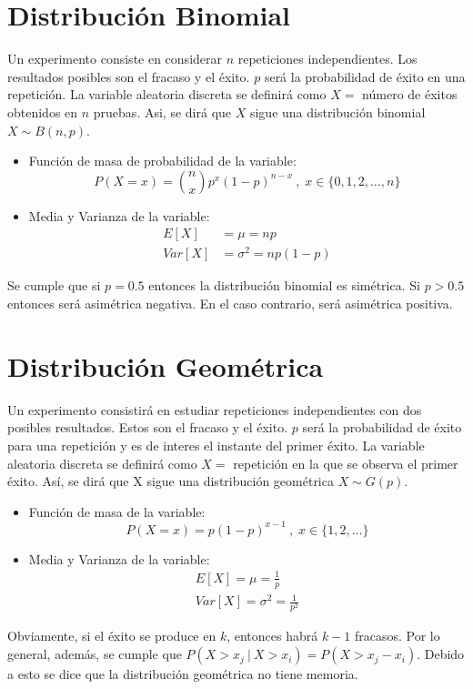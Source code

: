 \documentclass[10pt,a4paper]{book}
\begin{document}
\section{Distribución Binomial}
Un experimento consiste en considerar $n$ repeticiones independientes. Los resultados posibles son el fracaso y el éxito. $p$ será la probabilidad de éxito en una repetición. La variable aleatoria discreta se definirá como $X = $ número de éxitos obtenidos en $n$ pruebas. Asi, se dirá que $X$ sigue una distribución binomial $X\sim B(n,p)$.
\begin{itemize}
	\item Función de masa de probabilidad de la variable:
		\[P(X= x) = \binom{n}{x}p^x(1-p)^{n-x}\:,\; x\in\{0,1,2,\dots,n\}\]
	\item Media y Varianza de la variable:
		\[\begin{array}{rl} 
				E[X] \!\!\!\!&= \mu = np\\
				Var[X] \!\!\!\!&= \sigma^2 = np(1-p)
			\end{array}\]
\end{itemize}
Se cumple que si $p=0.5$ entonces la distribución binomial es simétrica. Si $p>0.5$ entonces será asimétrica negativa. En el caso contrario, será asimétrica positiva.

\section{Distribución Geométrica}
Un experimento consistirá en estudiar repeticiones independientes con dos posibles resultados. Estos son el fracaso y el éxito. $p$ será la probabilidad de éxito para una repetición y es de interes el instante del primer éxito. La variable aleatoria discreta se definirá como $X=$ repetición en la que se observa el primer éxito. Así, se dirá que X sigue una distribución geométrica $X\sim G(p)$.
\begin{itemize}
	\item Función de masa de la variable:
		\[P(X=x) = p(1-p)^{x-1}\:,\;x\in\{1,2,\dots\}\]
	\item Media y Varianza de la variable:
		\[\begin{array}{c}
			E[X] = \mu = \frac 1{p}\\
			Var[X] = \sigma^2 = \frac 1{p^2}
		\end{array}\]
\end{itemize}
Obviamente, si el éxito se produce en $k$, entonces habrá $k-1$ fracasos. Por lo general, además, se cumple que $P(X>x_j\:|\:X>x_i) = P(X>x_j-x_i)$. Debido a esto se dice que la distribución geométrica no tiene memoria.
\end{document}
